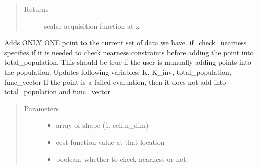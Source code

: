 \documentclass[letterpaper,12pt,english]{sphinxmanual}
\begin{document}
\begin{fulllineitems}
\begin{fulllineitems}
\begin{quote}
\begin{description}
\begin{itemize}
\end{itemize}

\item[{Returns}] \leavevmode
\sphinxAtStartPar
scalar acquisition function at x

\end{description}\end{quote}

\end{fulllineitems}


\begin{fulllineitems}
\label{\detokenize{PARyOpt:PARyOpt.paryopt.BayesOpt.add_point}}
\sphinxAtStartPar
Adds ONLY ONE point to the current set of data we have.
if\_check\_nearness specifies if it is needed to check nearness constraints before adding
the point into total\_population. This should be true if the user is
manually adding points into the population.
Updates following variables: K, K\_inv, total\_population, func\_vector
If the point is a failed evaluation, then it does not add into total\_population and func\_vector
\begin{quote}\begin{description}
\item[{Parameters}] \leavevmode\begin{itemize}
\item {} 
\sphinxAtStartPar
{} \textendash{} array of shape (1, self.n\_dim)

\item {} 
\sphinxAtStartPar
{} \textendash{} cost function value at that location

\item {} 
\sphinxAtStartPar
{} \textendash{} boolean, whether to check nearness or not.


\end{itemize}
\end{description}
\end{quote}
\end{fulllineitems}
\end{fulllineitems}
\end{document}

